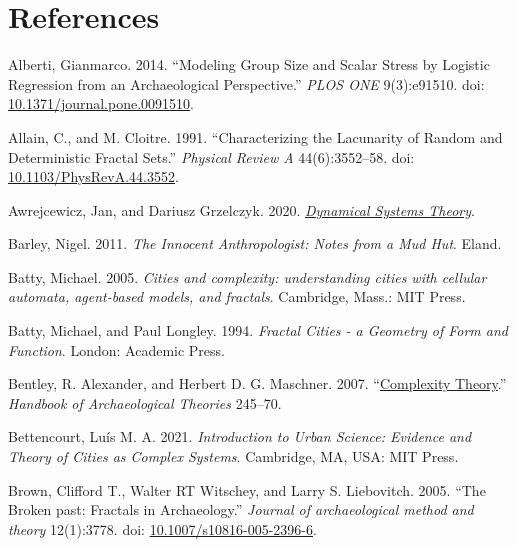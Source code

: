 \documentclass[
  12pt,
]{book}
\newlength{\cslhangindent}
\newlength{\cslentryspacingunit} %
\newenvironment{CSLReferences}[2] %
 {%
  \setlength{\parindent}{0pt}
  \ifodd #1
  \let\oldpar\par
  \def\par{\hangindent=\cslhangindent\oldpar}
  \fi
  \setlength{\parskip}{#2\cslentryspacingunit}
 }%
 {}
\begin{document}
\hypertarget{refs}{}
\begin{CSLReferences}{1}{0}
\hypertarget{references}{%
\chapter*{References}\label{references}}

\leavevmode{}%
Alberti, Gianmarco. 2014. {``Modeling Group Size and Scalar Stress by Logistic Regression from an Archaeological Perspective.''} \emph{PLOS ONE} 9(3):e91510. doi: \href{https://doi.org/10.1371/journal.pone.0091510}{10.1371/journal.pone.0091510}.

\leavevmode{}%
Allain, C., and M. Cloitre. 1991. {``Characterizing the Lacunarity of Random and Deterministic Fractal Sets.''} \emph{Physical Review A} 44(6):3552--58. doi: \href{https://doi.org/10.1103/PhysRevA.44.3552}{10.1103/PhysRevA.44.3552}.

\leavevmode{}%
Awrejcewicz, Jan, and Dariusz Grzelczyk. 2020. \emph{\href{https://doi.org/10.5772/intechopen.83328}{Dynamical Systems Theory}}.

\leavevmode{}%
Barley, Nigel. 2011. \emph{The Innocent Anthropologist: Notes from a Mud Hut}. Eland.

\leavevmode{}%
Batty, Michael. 2005. \emph{Cities and complexity: understanding cities with cellular automata, agent-based models, and fractals}. Cambridge, Mass.: MIT Press.

\leavevmode{}%
Batty, Michael, and Paul Longley. 1994. \emph{Fractal Cities - a Geometry of Form and Function}. London: Academic Press.

\leavevmode{}%
Bentley, R. Alexander, and Herbert D. G. Maschner. 2007. {``\href{https://research-information.bris.ac.uk/en/publications/complexity-theory}{Complexity Theory}.''} \emph{Handbook of Archaeological Theories} 245--70.

\leavevmode{}%
Bettencourt, Luís M. A. 2021. \emph{Introduction to Urban Science: Evidence and Theory of Cities as Complex Systems}. Cambridge, MA, USA: MIT Press.

\leavevmode{}%
Brown, Clifford T., Walter RT Witschey, and Larry S. Liebovitch. 2005. {``The Broken past: Fractals in Archaeology.''} \emph{Journal of archaeological method and theory} 12(1):3778. doi: \href{https://doi.org/10.1007/s10816-005-2396-6}{10.1007/s10816-005-2396-6}.


\end{CSLReferences}
\end{document}
